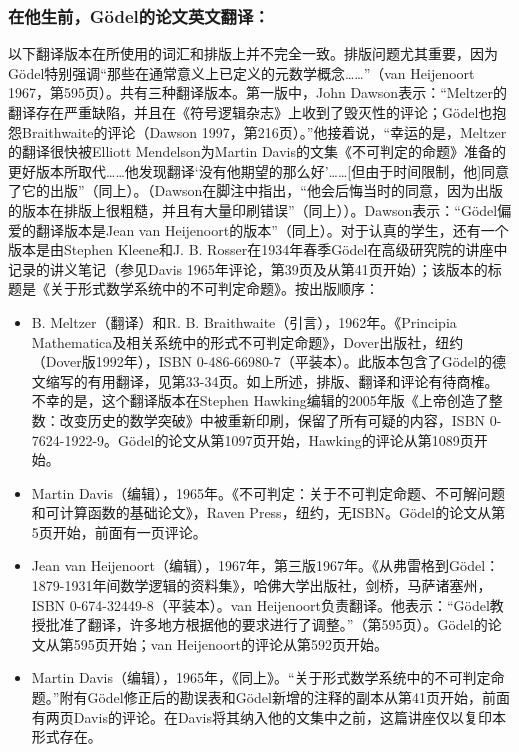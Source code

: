 \subsubsection{在他生前，Gödel的论文英文翻译：}
以下翻译版本在所使用的词汇和排版上并不完全一致。排版问题尤其重要，因为Gödel特别强调“那些在通常意义上已定义的元数学概念……”（van Heijenoort 1967，第595页）。共有三种翻译版本。第一版中，John Dawson表示：“Meltzer的翻译存在严重缺陷，并且在《符号逻辑杂志》上收到了毁灭性的评论；Gödel也抱怨Braithwaite的评论（Dawson 1997，第216页）。”他接着说，“幸运的是，Meltzer的翻译很快被Elliott Mendelson为Martin Davis的文集《不可判定的命题》准备的更好版本所取代……他发现翻译‘没有他期望的那么好’……[但由于时间限制，他]同意了它的出版”（同上）。（Dawson在脚注中指出，“他会后悔当时的同意，因为出版的版本在排版上很粗糙，并且有大量印刷错误”（同上））。Dawson表示：“Gödel偏爱的翻译版本是Jean van Heijenoort的版本”（同上）。对于认真的学生，还有一个版本是由Stephen Kleene和J. B. Rosser在1934年春季Gödel在高级研究院的讲座中记录的讲义笔记（参见Davis 1965年评论，第39页及从第41页开始）；该版本的标题是《关于形式数学系统中的不可判定命题》。按出版顺序：
\begin{itemize}
\item B. Meltzer（翻译）和R. B. Braithwaite（引言），1962年。《Principia Mathematica及相关系统中的形式不可判定命题》，Dover出版社，纽约（Dover版1992年），ISBN 0-486-66980-7（平装本）。此版本包含了Gödel的德文缩写的有用翻译，见第33-34页。如上所述，排版、翻译和评论有待商榷。不幸的是，这个翻译版本在Stephen Hawking编辑的2005年版《上帝创造了整数：改变历史的数学突破》中被重新印刷，保留了所有可疑的内容，ISBN 0-7624-1922-9。Gödel的论文从第1097页开始，Hawking的评论从第1089页开始。
\item Martin Davis（编辑），1965年。《不可判定：关于不可判定命题、不可解问题和可计算函数的基础论文》，Raven Press，纽约，无ISBN。Gödel的论文从第5页开始，前面有一页评论。
\item Jean van Heijenoort（编辑），1967年，第三版1967年。《从弗雷格到Gödel：1879-1931年间数学逻辑的资料集》，哈佛大学出版社，剑桥，马萨诸塞州，ISBN 0-674-32449-8（平装本）。van Heijenoort负责翻译。他表示：“Gödel教授批准了翻译，许多地方根据他的要求进行了调整。”（第595页）。Gödel的论文从第595页开始；van Heijenoort的评论从第592页开始。
\item Martin Davis（编辑），1965年，《同上》。“关于形式数学系统中的不可判定命题。”附有Gödel修正后的勘误表和Gödel新增的注释的副本从第41页开始，前面有两页Davis的评论。在Davis将其纳入他的文集中之前，这篇讲座仅以复印本形式存在。
\end{itemize}
